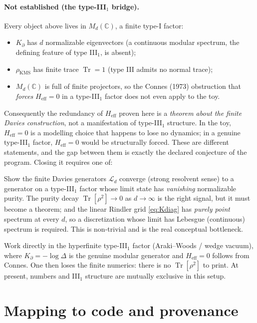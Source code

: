 \documentclass[11pt,a4paper]{article}
\theoremstyle{plain}
\theoremstyle{definition}
\newcommand{\Kp}{K_{\partial}}
\newcommand{\rhoKMS}{\rho_{\mathrm{KMS}}}
\newcommand{\Tr}{\operatorname{Tr}}
\newcommand{\Heff}{H_{\mathrm{eff}}}
\begin{document}
\paragraph{Not established (the type-III$_1$ bridge).}
Every object above lives in $M_d(\mathbb{C})$, a finite type-I factor:
\begin{itemize}[leftmargin=1.6em]
\item $\Kp$ has $d$ normalizable eigenvectors (a continuous modular spectrum, the
  defining feature of type III$_1$, is absent);
\item $\rhoKMS$ has finite trace $\Tr=1$ (type III admits no normal trace);
\item $M_d(\mathbb{C})$ is full of finite projectors, so the Connes (1973)
  obstruction that \emph{forces} $\Heff=0$ in a type-III$_1$ factor does not even
  apply to the toy.
\end{itemize}
Consequently the redundancy of $\Heff$ proven here is a \emph{theorem about the
finite Davies construction}, not a manifestation of type-III$_1$ structure. In
the toy, $\Heff=0$ is a modelling choice that happens to lose no dynamics; in a
genuine type-III$_1$ factor, $\Heff=0$ would be structurally forced. These are
different statements, and the gap between them is exactly the declared conjecture
of the program. Closing it requires one of:
\begin{description}[leftmargin=2.2em]
\item[Route A (continuum limit).] Show the finite Davies generators
  $\mathcal{L}_d$ converge (strong resolvent sense) to a generator on a
  type-III$_1$ factor whose limit state has \emph{vanishing} normalizable purity.
  The purity decay $\Tr[\rho^2]\to0$ as $d\to\infty$ is the right signal, but it
  must become a theorem; and the linear Rindler grid \eqref{eq:Kdiag} has
  \emph{purely point} spectrum at every $d$, so a discretization whose limit has
  Lebesgue (continuous) spectrum is required. This is non-trivial and is the real
  conceptual bottleneck.
\item[Route B (build in III$_1$).] Work directly in the hyperfinite type-III$_1$
  factor (Araki--Woods / wedge vacuum), where $\Kp=-\log\Delta$ is the genuine
  modular generator and $\Heff=0$ follows from Connes. One then loses the finite
  numerics: there is no $\Tr[\rho^2]$ to print. At present, numbers and III$_1$
  structure are mutually exclusive in this setup.
\end{description}

\section{Mapping to code and provenance}\label{sec:provenance}
\end{document}
